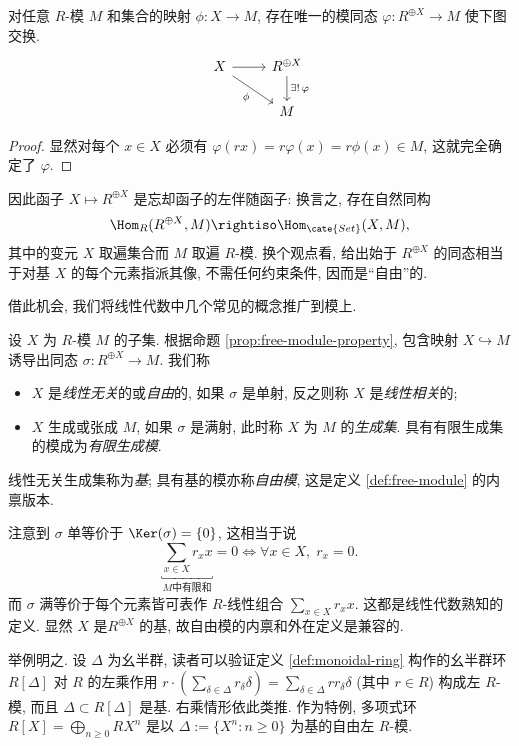 \begin{proposition}\label{prop:free-module-property}
	对任意 $R$-模 $M$ 和集合的映射 $\phi: X \to M$, 存在唯一的模同态 $\varphi: R^{\oplus X} \to M$ 使下图交换.
	\[ \begin{tikzcd}
		X \arrow[rd, "\phi"'] \arrow[r] & R^{\oplus X} \arrow[d, "{\exists! \, \varphi}"] \\
		& M
	\end{tikzcd} \]
\end{proposition}
\begin{proof}
	显然对每个 $x \in X$ 必须有 $\varphi(rx) = r\varphi(x) = r\phi(x) \in M$, 这就完全确定了 $\varphi$.
\end{proof}
因此函子 $X \mapsto R^{\oplus X}$ 是忘却函子的左伴随函子: 换言之, 存在自然同构
\[ \Hom_R(R^{\oplus X}, M) \rightiso \Hom_\cate{Set}(X, M), \]
其中的变元 $X$ 取遍集合而 $M$ 取遍 $R$-模. 换个观点看, 给出始于 $R^{\oplus X}$ 的同态相当于对基 $X$ 的每个元素指派其像, 不需任何约束条件, 因而是``自由''的.

借此机会, 我们将线性代数中几个常见的概念推广到模上.
\begin{definition}
	设 $X$ 为 $R$-模 $M$ 的子集. 根据命题 \ref{prop:free-module-property}, 包含映射 $X \hookrightarrow M$ 诱导出同态 $\sigma: R^{\oplus X} \to M$. 我们称
	\begin{itemize}
		\item $X$ 是\emph{线性无关}的或\emph{自由}的, 如果 $\sigma$ 是单射, 反之则称 $X$ 是\emph{线性相关}的;
		\item $X$ 生成或张成 $M$, 如果 $\sigma$ 是满射, 此时称 $X$ 为 $M$ 的\emph{生成集}. 具有有限生成集的模成为\emph{有限生成模}.
	\end{itemize}
	线性无关生成集称为\emph{基}; 具有基的模亦称\emph{自由模}, 这是定义 \ref{def:free-module} 的内禀版本.
\end{definition}
注意到 $\sigma$ 单等价于 $\Ker(\sigma)=\{0\}$, 这相当于说
\[ \underbracket{\sum_{x \in X} r_x x}_{M \text{中有限和}} = 0 \iff \forall x \in X, \; r_x = 0. \]
而 $\sigma$ 满等价于每个元素皆可表作 $R$-线性组合 $\sum_{x \in X} r_x x$. 这都是线性代数熟知的定义. 显然 $X$ 是$R^{\oplus X}$ 的基, 故自由模的内禀和外在定义是兼容的.

举例明之. 设 $\Delta$ 为幺半群, 读者可以验证定义 \ref{def:monoidal-ring} 构作的幺半群环 $R[\Delta]$ 对 $R$ 的左乘作用 $r\cdot(\sum_{\delta \in \Delta} r_\delta \delta) = \sum_{\delta \in \Delta} rr_\delta \delta$ (其中 $r \in R$) 构成左 $R$-模, 而且 $\Delta \subset R[\Delta]$ 是基. 右乘情形依此类推. 作为特例, 多项式环 $R[X] = \bigoplus_{n \geq 0 }RX^n$ 是以 $\Delta := \{ X^n: n \geq 0 \}$ 为基的自由左 $R$-模.

